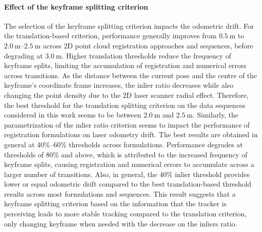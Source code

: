 \paragraph{Effect of the keyframe splitting criterion}
The selection of the keyframe splitting criterion impacts the odometric
drift. For the translation-based criterion, performance generally improves from
$\SI{0.5}{\metre}$ to $\SI{2.0}{\metre}$--$\SI{2.5}{\metre}$ across 2D point
cloud registration approaches and sequences, before degrading at
$\SI{3.0}{\metre}$. Higher translation thresholds reduce the frequency of
keyframe splits, limiting the accumulation of registration and numerical errors
across transitions. As the distance between the current pose and the centre of
the keyframe's coordinate frame increases, the inlier ratio decreases while also
changing the point density due to the 2D laser scanner radial effect.
Therefore, the best threshold for the translation splitting criterion on
the data sequences considered in this work seems to be between
$\SI{2.0}{\metre}$ and $\SI{2.5}{\metre}$.
Similarly, the parametrization of the inlier ratio criterion seems to impact
the performance of registration formulations on laser odometry drift.
The best results are obtained in general at 40\%--60\% thresholds across
formulations. Performance degrades at thresholds of 80\% and above,
which is attributed to the increased frequency of keyframe splits,
causing registration and numerical errors to accumulate
across a larger number of transitions.
Also, in general, the 40\% inlier threshold provides lower or equal
odometric drift compared to the best translation-based threshold results across
most formulations and sequences. This result suggests that a keyframe splitting
criterion based on the information that the tracker is perceiving
leads to more stable tracking compared to the translation criterion,
only changing keyframe when needed with the decrease on the inliers ratio.

